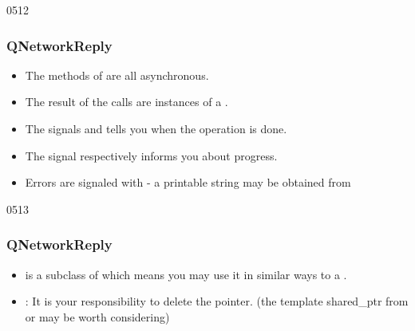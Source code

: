 \begin{slide}{0512}
\frametitle{QNetworkReply}
\begin{itemize}
\item The methods of  are all asynchronous.
\item The result of the calls are instances of a .
\item The signals  and
   tells you
  when the operation is done.
\item The signal  respectively  informs
  you about progress.
\item Errors are signaled with
   - a printable string may
  be obtained from 
\end{itemize}
\end{slide}

\begin{slide}{0513}
\frametitle{QNetworkReply}
\begin{itemize}
\item {} is a subclass of  which means
  you may use it in similar ways to a .
\item \pleaseNote: It is your responsibility to delete the
   pointer. (the template shared\_ptr from  or
   may be worth considering)
\end{itemize}
\end{slide}
